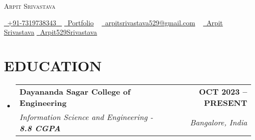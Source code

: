 \documentclass[letterpaper,11pt]{article}
\makeatletter
\newcommand{\resumeSubheading}[4]{
  \vspace{-2pt}\item
    \begin{tabular*}{1.0\textwidth}[t]{l@{\extracolsep{\fill}}r}
      \textbf{\large#1} & \textbf{\small #2} \\
      \textit{\large#3} & \textit{\small #4} \\
      
    \end{tabular*}\vspace{-7pt}
}
\newcommand{\resumeSubHeadingListStart}{\begin{itemize}[leftmargin=0.0in, label={}]}
\newcommand{\resumeSubHeadingListEnd}{\end{itemize}}
\makeatother
\begin{document}


\begin{center}
    {\Huge \scshape Arpit Srivastava} \\ \vspace{1pt}
   
    \small \href{tel:+xxxxxxxxxxxx}{ \raisebox{-0.1\height}\faPhone\ \underline{+91-7319738343} ~}
    \href{https://arpit529srivastava.tech/}{\raisebox{-0.1\height}\faGlobe\ \underline{Portfolio}} ~
    \hspace{8pt} %
    \href{mailto:arpitsrivastava529@gmail.com}{\raisebox{-0.2\height}\faEnvelope\  \underline{arpitsrivastava529@gmail.com}} ~ 
    \href{https://www.linkedin.com/in/arpitsrivastava529/}{\raisebox{-0.2\height}\faLinkedinSquare\ \underline{Arpit Srivastava}} 
    \hspace{10pt} %
    \href{https://github.com/arpit529srivastava}{\raisebox{-0.2\height}\faGithubSquare\ \underline{Arpit529Srivastava}}
\end{center}

\section{EDUCATION}
  \resumeSubHeadingListStart
    \resumeSubheading
      {Dayananda Sagar College of Engineering}{OCT 2023 -- PRESENT}
      {Information Science and Engineering -  \textbf{8.8 CGPA}}{Bangalore, India}
      \vspace{-2pt}
  \resumeSubHeadingListEnd

  


        
               
\end{document}
